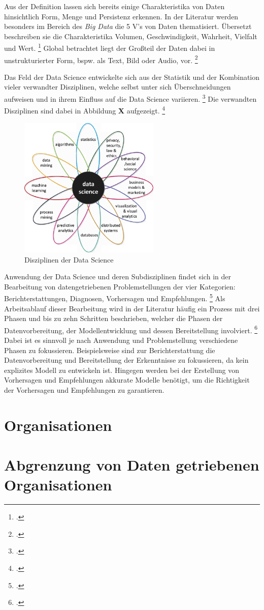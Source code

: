 Aus der Definition lassen sich bereits einige Charakteristika von Daten hinsichtlich Form, Menge und Persistenz erkennen.
In der Literatur werden besonders im Bereich des \textit{Big Data} die 5 V's von Daten thematisiert.
Übersetzt beschreiben sie die Charakteristika Volumen, Geschwindigkeit, Wahrheit, Vielfalt und Wert. \footcite[prenote][postnote]{Big data is always}
Global betrachtet liegt der Großteil der Daten dabei in unstrukturierter Form, bspw. als Text, Bild oder Audio, vor. \footcite[prenote][postnote]{most of the data}

Das Feld der Data Science entwickelte sich aus der Statistik und der Kombination vieler verwandter Disziplinen, welche selbst unter sich Überschneidungen aufweisen und in ihrem Einfluss auf die Data Science variieren. \footcite[prenote][postnote]{disciplines of data science}
Die verwandten Disziplinen sind dabei in Abbildung \textbf{X} aufgezeigt. \footcite[prenote][postnote]{disciplines of data science}

\begin{figure}
    \centering
    \includegraphics[width=0.6\textwidth]{graphics/ds_disciplines.png}
    \caption{Disziplinen der Data Science}
    \label{fig:data science disciplines}
\end{figure}

Anwendung der Data Science und deren Subdisziplinen findet sich in der Bearbeitung von datengetriebenen Problemstellungen der vier Kategorien: Berichterstattungen, Diagnosen, Vorhersagen und Empfehlungen. \footcite[prenote][postnote]{four main categories}
Als Arbeitsablauf dieser Bearbeitung wird in der Literatur häufig ein Prozess mit drei Phasen und bis zu zehn Schritten beschrieben, welcher die Phasen der Datenvorbereitung, der Modellentwicklung und dessen Bereitstellung involviert. \footcite[prenote][postnote]{data science process as roughly 3}
Dabei ist es sinnvoll je nach Anwendung und Problemstellung verschiedene Phasen zu fokussieren.
Beispielsweise sind zur Berichterstattung die Datenvorbereitung und Bereitstellung der Erkenntnisse zu fokussieren, da kein explizites Modell zu entwickeln ist. 
Hingegen werden bei der Erstellung von Vorhersagen und Empfehlungen akkurate Modelle benötigt, um die Richtigkeit der Vorhersagen und Empfehlungen zu garantieren.


\section{Organisationen}

\section{Abgrenzung von Daten getriebenen Organisationen}